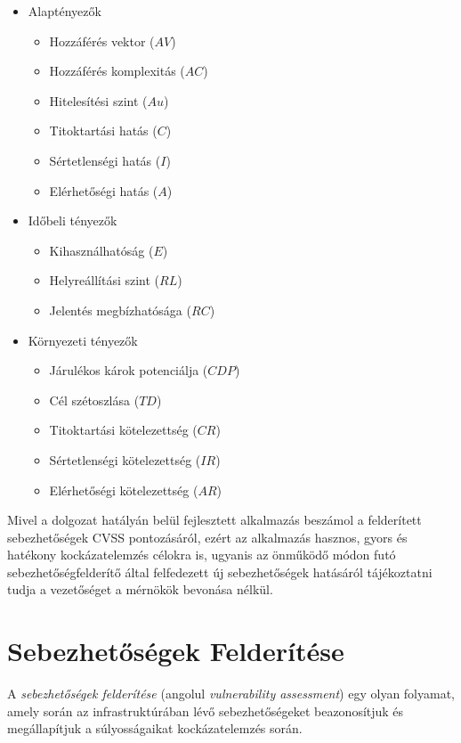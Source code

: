\documentclass[a4paper,12pt]{article}
\begin{document}
	\begin{multicols}{2}
		\begin{itemize}
			\item Alaptényezők
				\begin{itemize}
					\item Hozzáférés vektor ($AV$)
					\item Hozzáférés komplexitás ($AC$)
					\item Hitelesítési szint ($Au$)
					\item Titoktartási hatás ($C$)
					\item Sértetlenségi hatás ($I$)
					\item Elérhetőségi hatás ($A$)
				\end{itemize}
			\item Időbeli tényezők
				\begin{itemize}
					\item Kihasználhatóság ($E$)
					\item Helyreállítási szint ($RL$)
					\item Jelentés megbízhatósága ($RC$)
				\end{itemize}
			\item Környezeti tényezők
				\begin{itemize}
					\item Járulékos károk potenciálja ($CDP$)
					\item Cél szétoszlása ($TD$)
					\item Titoktartási kötelezettség ($CR$)
					\item Sértetlenségi kötelezettség ($IR$)
					\item Elérhetőségi kötelezettség ($AR$)
				\end{itemize}
		\end{itemize}
	\end{multicols}
	
	Mivel a dolgozat hatályán belül fejlesztett alkalmazás beszámol a felderített sebezhetőségek CVSS pontozásáról, ezért az alkalmazás hasznos, gyors és hatékony kockázatelemzés célokra is, ugyanis az önműködő módon futó sebezhetőségfelderítő által felfedezett új sebezhetőségek hatásáról tájékoztatni tudja a vezetőséget a mérnökök bevonása nélkül.
	
\section{Sebezhetőségek Felderítése}
	
	A \textit{sebezhetőségek felderítése} (angolul \textit{vulnerability assessment}) egy olyan folyamat, amely során az infrastruktúrában lévő sebezhetőségeket beazonosítjuk és megállapítjuk a súlyosságaikat kockázatelemzés során.
	
\end{document}
